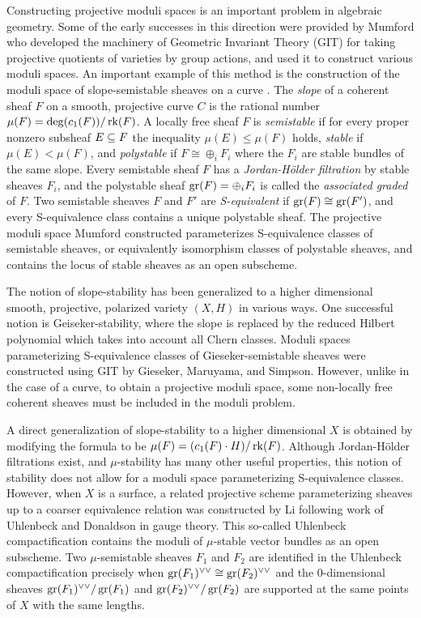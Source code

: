 \documentclass[letterpaper,11pt]{amsart}%
\theoremstyle{remark}
\begin{document}
Constructing projective moduli spaces is an important problem in algebraic geometry. Some of the early successes in this direction were provided by Mumford who developed the machinery of Geometric Invariant Theory (GIT) for taking projective quotients of varieties by group actions, and used it to construct various moduli spaces. An important example of this method is the construction of the moduli space of slope-semistable sheaves on a curve \cite{mumford}. The \textit{slope} of a coherent sheaf $F$ on a smooth, projective curve $C$ is the rational number $\mu(F) = \deg(c_1(F))/\operatorname{\mathrm{rk}}(F)$. A locally free sheaf $F$ is \textit{semistable} if for every proper nonzero subsheaf $E \subseteq F$ the inequality $\mu(E) \le \mu(F)$ holds, \textit{stable} if $\mu(E) < \mu(F)$, and \textit{polystable} if $F \cong \oplus_i F_i$ where the $F_i$ are stable bundles of the same slope. Every semistable sheaf $F$ has a \textit{Jordan-H\"older filtration} by stable sheaves $F_i$, and the polystable sheaf $\operatorname{\mathrm{gr}}(F) = \oplus_i F_i$ is called the \textit{associated graded} of $F$. Two semistable sheaves $F$ and $F'$ are \textit{S-equivalent} if $\operatorname{\mathrm{gr}}(F) \cong \operatorname{\mathrm{gr}}(F')$, and every S-equivalence class contains a unique polystable sheaf. The projective moduli space Mumford constructed parameterizes S-equivalence classes of semistable sheaves, or equivalently isomorphism classes of polystable sheaves, and contains the locus of stable sheaves as an open subscheme.

The notion of slope-stability has been generalized to a higher dimensional smooth, projective, polarized variety $(X, H)$ in various ways. One successful notion is Geiseker-stability, where the slope is replaced by the reduced Hilbert polynomial which takes into account all Chern classes. Moduli spaces parameterizing S-equivalence classes of Gieseker-semistable sheaves were constructed using GIT by Gieseker, Maruyama, and Simpson. However, unlike in the case of a curve, to obtain a projective moduli space, some non-locally free coherent sheaves must be included in the moduli problem.

A direct generalization of slope-stability to a higher dimensional $X$ is obtained by modifying the formula to be $\mu(F) = (c_1(F) \cdot H)/\operatorname{\mathrm{rk}}(F)$. Although Jordan-H\"older filtrations exist, and $\mu$-stability has many other useful properties, this notion of stability does not allow for a moduli space parameterizing S-equivalence classes. However, when $X$ is a surface, a related projective scheme parameterizing sheaves up to a coarser equivalence relation was constructed by Li \cite{li} following work of Uhlenbeck and Donaldson in gauge theory. This so-called Uhlenbeck compactification contains the moduli of $\mu$-stable vector bundles as an open subscheme. Two $\mu$-semistable sheaves $F_1$ and $F_2$ are identified in the Uhlenbeck compactification precisely when $\operatorname{\mathrm{gr}}(F_1)^{\vee\vee} \cong \operatorname{\mathrm{gr}}(F_2)^{\vee\vee}$ and the 0-dimensional sheaves $\operatorname{\mathrm{gr}}(F_1)^{\vee\vee}/\operatorname{\mathrm{gr}}(F_1)$ and $\operatorname{\mathrm{gr}}(F_2)^{\vee\vee}/\operatorname{\mathrm{gr}}(F_2)$ are supported at the same points of $X$ with the same lengths. 
\end{document}
